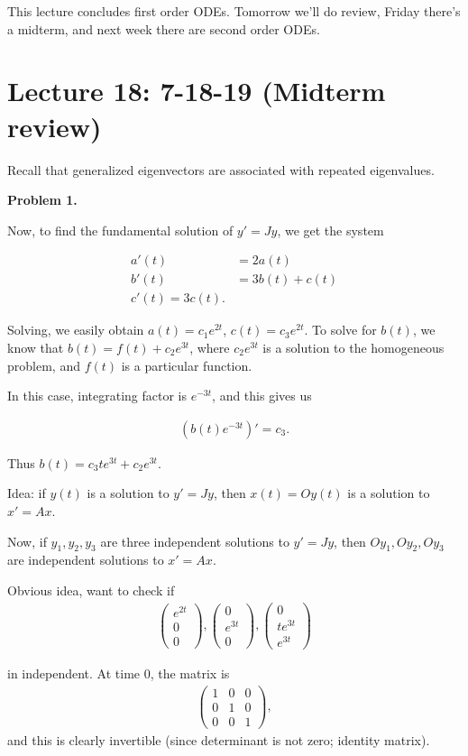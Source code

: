 \documentclass{article}
\newcommand{\mat}[1]{\begin{pmatrix}#1\end{pmatrix}}
\begin{document}
This lecture concludes first order ODEs.  Tomorrow we'll do review, Friday there's a midterm, and next week there are second order ODEs.


\section{Lecture 18: 7-18-19 (Midterm review)}

Recall that generalized eigenvectors are associated with repeated eigenvalues.

{\bf Problem 1.}

Now, to find the fundamental solution of $y' = J y$, we get the system

\begin{align*}
  a'(t) &= 2 a(t) \\
  b'(t) &= 3 b(t) + c(t) \\
  c'(t) = 3 c(t).
\end{align*}

Solving, we easily obtain $a(t) = c_1 e^{2t}$, $c(t) = c_3 e^{2t}$.  To solve for $b(t)$, we know that $b(t) = f(t) + c_2 e^{3t}$, where $c_2 e^{3t}$ is a solution to the homogeneous problem, and $f(t)$ is a particular function.

In this case, integrating factor is $e^{-3t}$, and this gives us

\begin{align*}
  (b(t) e^{-3t})' = c_3.
\end{align*}

Thus $b(t) = c_3t e^{3t} + c_2 e^{3t}$.

Idea: if $y(t)$ is a solution to $y' = J y$, then $x(t) = O y(t)$ is a solution to $x' = A x$.

Now, if $y_1, y_2, y_3$ are three independent solutions to $y' = Jy$, then $O y_1, O y_2, Oy_3$ are independent solutions to $x' = Ax$.

Obvious idea, want to check if
\begin{align*}
  \mat{e^{2t} \\ 0 \\ 0}, \mat{0 \\ e^{3t} \\ 0}, \mat{0 \\ t e^{3t} \\ e^{3t}}
\end{align*}

in independent.  At time 0, the matrix is
\begin{align*}
  \mat{1 & 0 & 0 \\ 0 & 1 & 0 \\ 0 & 0 & 1},
\end{align*}
and this is clearly invertible (since determinant is not zero; identity matrix).
\end{document}
